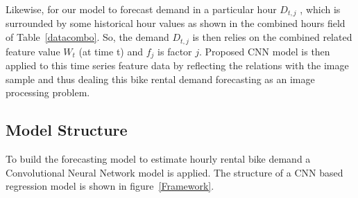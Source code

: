 Likewise, for our model to forecast demand in a particular hour $D_{t,j}$ , which is surrounded by some historical hour values as shown in the combined hours field of Table~\ref{datacombo}. So, the demand $D_{t,j}$ is then relies on the combined related feature value $W_t$ (at time t) and $f_j$ is factor $j$. Proposed CNN model is then applied to this time series feature data by reflecting the relations with the image sample and thus dealing this bike rental demand forecasting as an image processing problem. 




\subsection{Model Structure}
\label{structure}

To build the forecasting model to estimate hourly rental bike demand a Convolutional Neural Network model is applied. The structure of a CNN based regression model is shown in figure~\ref{Framework}.


\begin{figure}
\centering
{}
\end{figure}


